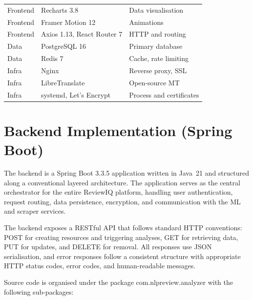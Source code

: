 \documentclass[12pt,a4paper,oneside]{report}
\renewcommand{\texttt}[1]{%
  {\ttfamily\hyphenchar\font=45\relax #1}}
\begin{document}
\begin{table}[ht]
\begin{tabularx}{\textwidth}{l l X}
Frontend  & Recharts 3.8                   & Data visualisation \\
Frontend  & Framer Motion 12               & Animations \\
Frontend  & Axios 1.13, React Router 7     & HTTP and routing \\
Data      & PostgreSQL 16                  & Primary database \\
Data      & Redis 7                        & Cache, rate limiting \\
Infra     & Nginx                          & Reverse proxy, SSL \\
Infra     & LibreTranslate                 & Open-source MT \\
Infra     & systemd, Let's Encrypt          & Process and certificates \\
\bottomrule
\end{tabularx}
\end{table}

\section{Backend Implementation (Spring Boot)}
The backend is a Spring Boot 3.3.5 application written in Java~21 and
structured along a conventional layered architecture. The application
serves as the central orchestrator for the entire ReviewIQ platform,
handling user authentication, request routing, data persistence,
encryption, and communication with the ML and scraper services.

The backend exposes a RESTful API that follows standard HTTP conventions:
POST for creating resources and triggering analyses, GET for retrieving
data, PUT for updates, and DELETE for removal. All responses use JSON
serialisation, and error responses follow a consistent structure with
appropriate HTTP status codes, error codes, and human-readable messages.

Source code is organised under the package
\texttt{com.nlpreview.analyzer} with the following sub-packages:
\end{document}
